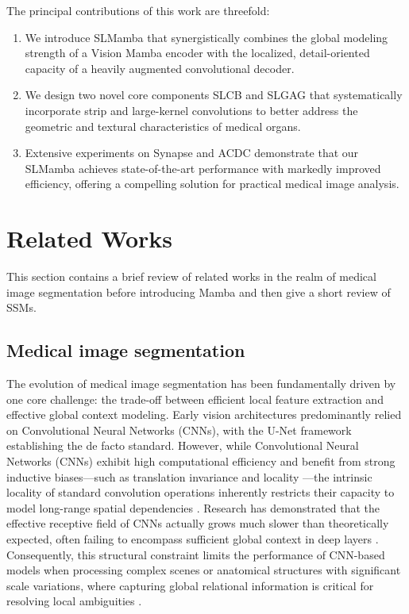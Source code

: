 \documentclass[10pt, a4paper, twocolumn]{article}
\begin{document}
The principal contributions of this work are threefold: 
\begin{enumerate}
\item We introduce SLMamba that synergistically combines the global modeling strength of a Vision Mamba encoder with the localized, detail-oriented capacity of a heavily augmented convolutional decoder. 
\item We design two novel core components SLCB and SLGAG that systematically incorporate strip and large-kernel convolutions to better address the geometric and textural characteristics of medical organs. 
\item Extensive experiments on Synapse and ACDC demonstrate that our SLMamba achieves state-of-the-art performance with markedly improved efficiency, offering a compelling solution for practical medical image analysis.
\end{enumerate}


\section{Related Works}

This section contains a brief review of related works in the realm of medical image segmentation before introducing Mamba and then give a short review of SSMs.

\subsection{Medical image segmentation}

The evolution of medical image segmentation has been fundamentally driven by one core challenge: the trade-off between efficient local feature extraction and effective global context modeling. Early vision architectures predominantly relied on Convolutional Neural Networks (CNNs)\cite{ronneberger2015unet}, with the U-Net framework establishing the de facto standard. However, while Convolutional Neural Networks (CNNs) exhibit high computational efficiency and benefit from strong inductive biases—such as translation invariance and locality \cite{lecun2015deep, he2016resnet}—the intrinsic locality of standard convolution operations inherently restricts their capacity to model long-range spatial dependencies \cite{wang2018nonlocal}. Research has demonstrated that the effective receptive field of CNNs actually grows much slower than theoretically expected, often failing to encompass sufficient global context in deep layers \cite{luo2016erf}. Consequently, this structural constraint limits the performance of CNN-based models when processing complex scenes or anatomical structures with significant scale variations, where capturing global relational information is critical for resolving local ambiguities \cite{dosovitskiy2020vit, chen2021transunet}.
\end{document}
